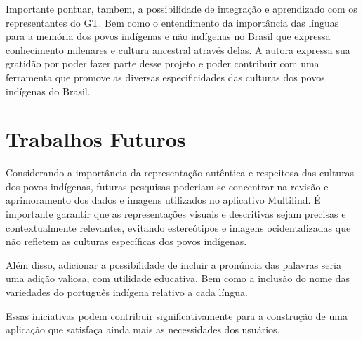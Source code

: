 Importante pontuar, tambem, a possibilidade de integração e aprendizado com os representantes do GT. Bem como o entendimento da importância das línguas para a memória dos povos indígenas e não indígenas no Brasil que expressa 
conhecimento milenares e cultura ancestral através delas. A autora expressa sua gratidão por poder fazer parte desse projeto e poder contribuir com uma ferramenta que promove as diversas especificidades das culturas dos 
povos indígenas do Brasil. 

\section{Trabalhos Futuros}
\label{sec:Trabalhos Futuros}
Considerando a importância da representação autêntica e respeitosa das culturas dos povos indígenas, futuras pesquisas poderiam se concentrar na revisão e aprimoramento dos dados e imagens utilizados no aplicativo Multilind. É 
importante garantir que as representações visuais e descritivas sejam precisas e contextualmente relevantes, evitando estereótipos e imagens ocidentalizadas que não refletem as culturas específicas dos povos indígenas. 

Além disso, adicionar a possibilidade de incluir a pronúncia das palavras seria uma adição valiosa, com utilidade educativa. Bem como a inclusão do nome das variedades do português indígena relativo a cada língua.

Essas iniciativas podem contribuir significativamente para a construção de uma aplicação que satisfaça ainda mais as necessidades dos usuários.
